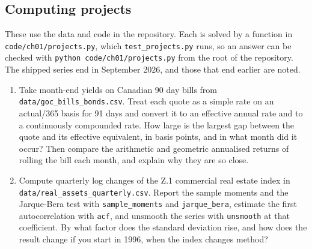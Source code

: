 \begin{chapterrefs}
\subsection*{Computing projects}
\label{sec1:projects}
These use the data and code in the repository. Each is solved by a function in
\texttt{code/ch01/projects.py}, which \texttt{test\_projects.py} runs, so an answer can be
checked with \texttt{python code/ch01/projects.py} from the root of the repository. The
shipped series end in September 2026, and those that end earlier are noted.

\begin{enumerate}[label=\textbf{P1.\arabic*}, leftmargin=*, ref=P1.\arabic*]
\item Take month-end yields on Canadian 90 day bills from \texttt{data/goc\_bills\_bonds.csv}. Treat each
quote as a simple rate on an actual/365 basis for 91 days and convert it to an effective annual rate and
to a continuously compounded rate. How large is the largest gap between the quote and its effective
equivalent, in basis points, and in what month did it occur? Then compare the arithmetic and geometric
annualised returns of rolling the bill each month, and explain why they are so close.
\item Compute quarterly log changes of the Z.1 commercial real estate index in
\texttt{data/real\_assets\_quarterly.csv}. Report the sample moments and the Jarque-Bera test with
\texttt{sample\_moments} and \texttt{jarque\_bera}, estimate the first autocorrelation with \texttt{acf}, and
unsmooth the series with \texttt{unsmooth} at that coefficient. By what factor does the standard deviation
rise, and how does the result change if you start in 1996, when the index changes method?
\end{enumerate}


\end{chapterrefs}
